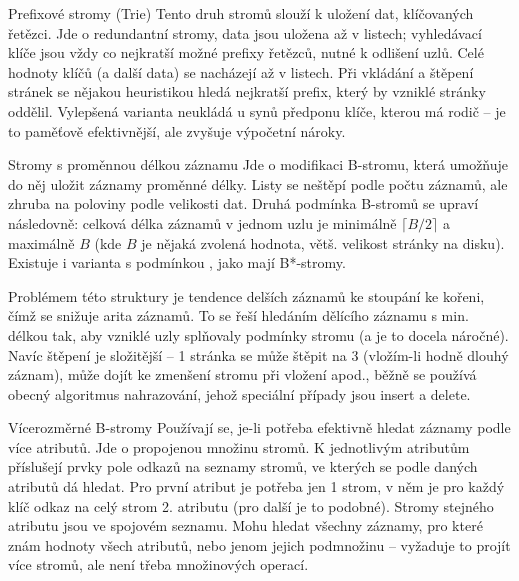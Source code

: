 \begin{definiceN}{Prefixové stromy (Trie)}
Tento druh stromů slouží k uložení dat, klíčovaných řetězci. Jde o redundantní stromy, data jsou uložena až v listech; vyhledávací klíče jsou vždy co nejkratší možné prefixy řetězců, nutné k odlišení uzlů. Celé hodnoty klíčů (a další data) se nacházejí až v listech. Při vkládání a štěpení stránek se nějakou heuristikou hledá nejkratší prefix, který by vzniklé stránky oddělil. Vylepšená varianta neukládá u synů předponu klíče, kterou má rodič -- je to paměťově efektivnější, ale zvyšuje výpočetní nároky.
\end{definiceN}

\begin{definiceN}{Stromy s proměnnou délkou záznamu}
Jde o modifikaci B-stromu, která umožňuje do něj uložit záznamy proměnné délky. Listy se neštěpí podle počtu záznamů, ale zhruba na poloviny podle velikosti dat. Druhá podmínka B-stromů se upraví následovně: celková délka záznamů v jednom uzlu je minimálně $\lceil B/2\rceil$ a maximálně $B$ (kde $B$ je nějaká zvolená hodnota, větš. velikost stránky na disku). Existuje i varianta s podmínkou , jako mají B*-stromy.

Problémem této struktury je tendence delších záznamů ke stoupání ke kořeni, čímž se snižuje arita záznamů. To se řeší hledáním dělícího záznamu s min. délkou tak, aby vzniklé uzly splňovaly podmínky stromu (a je to docela náročné). Navíc štěpení je složitější -- 1 stránka se může štěpit na 3 (vložím-li hodně dlouhý záznam), může dojít ke zmenšení stromu při vložení apod., běžně se používá obecný algoritmus nahrazování, jehož speciální případy jsou insert a delete.
\end{definiceN}


\begin{definiceN}{Vícerozměrné B-stromy}
Používají se, je-li potřeba efektivně hledat záznamy podle více atributů. Jde o propojenou množinu stromů. K jednotlivým atributům příslušejí prvky pole odkazů na seznamy stromů, ve kterých se podle daných atributů dá hledat. Pro první atribut je potřeba jen 1 strom, v něm je pro každý klíč odkaz na celý strom 2. atributu (pro další je to podobné). Stromy stejného atributu jsou ve spojovém seznamu. Mohu hledat všechny záznamy, pro které znám hodnoty všech atributů, nebo jenom jejich podmnožinu -- vyžaduje to projít více stromů, ale není třeba množinových operací.
\end{definiceN}
